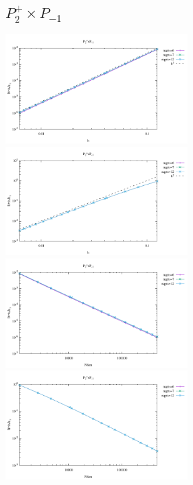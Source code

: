 \subsection*{$P_2^+\times P_{-1}$}
\begin{center}
\includegraphics[width=7cm]{python_codes/fieldstone_120/results/P2+P-1-velocity-h.pdf}
\includegraphics[width=7cm]{python_codes/fieldstone_120/results/P2+P-1-pressure-h.pdf}
\includegraphics[width=7cm]{python_codes/fieldstone_120/results/P2+P-1-velocity-Nfem.pdf}
\includegraphics[width=7cm]{python_codes/fieldstone_120/results/P2+P-1-pressure-Nfem.pdf}
\end{center}

